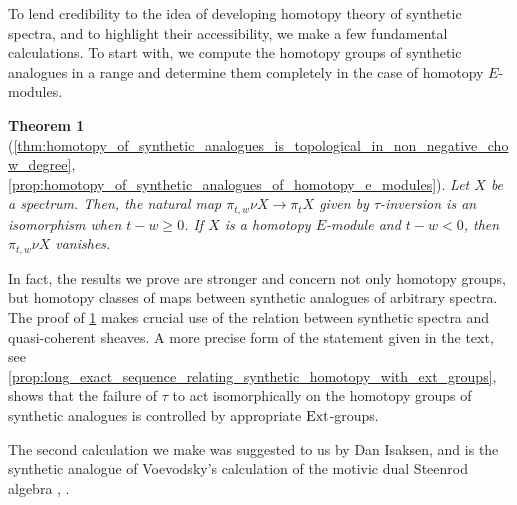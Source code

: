 \documentclass[oneside,a4paper]{amsart}
\newcommand{\Ext}{\textnormal{Ext}} %
\theoremstyle{plain}
\newtheorem{thm}{Theorem}[section]
\theoremstyle{definition}
\theoremstyle{remark}
\begin{document}
To lend credibility to the idea of developing homotopy theory of synthetic spectra, and to highlight their accessibility, we make a few fundamental calculations. To start with, we compute the homotopy groups of synthetic analogues in a range and determine them completely in the case of homotopy $E$-modules.

\begin{thm}[\ref{thm:homotopy_of_synthetic_analogues_is_topological_in_non_negative_chow_degree}, \ref{prop:homotopy_of_synthetic_analogues_of_homotopy_e_modules}]
\label{thm:introduction_homotopy_of_synthetic_analogues}
Let $X$ be a spectrum. Then, the natural map $\pi_{t, w} \nu X \rightarrow \pi_{t} X$ given by $\tau$-inversion is an isomorphism when $t - w \geq 0$. If $X$ is a homotopy $E$-module and $t - w < 0$, then $\pi_{t, w} \nu X$ vanishes. 
\end{thm}
In fact, the results we prove are stronger and concern not only homotopy groups, but homotopy classes of maps between synthetic analogues of arbitrary spectra. The proof of \cref{thm:introduction_homotopy_of_synthetic_analogues} makes crucial use of the relation between synthetic spectra and quasi-coherent sheaves. A more precise form of the statement given in the text, see \cref{prop:long_exact_sequence_relating_synthetic_homotopy_with_ext_groups}, shows that the failure of $\tau$ to act isomorphically on the homotopy groups of synthetic analogues is controlled by appropriate $\Ext$-groups. 

The second calculation we make was suggested to us by Dan Isaksen, and is the synthetic analogue of Voevodsky's calculation of the motivic dual Steenrod algebra \cite{voevodsky2003motivic}, \cite{voevodsky2010motivic}.
\end{document}
